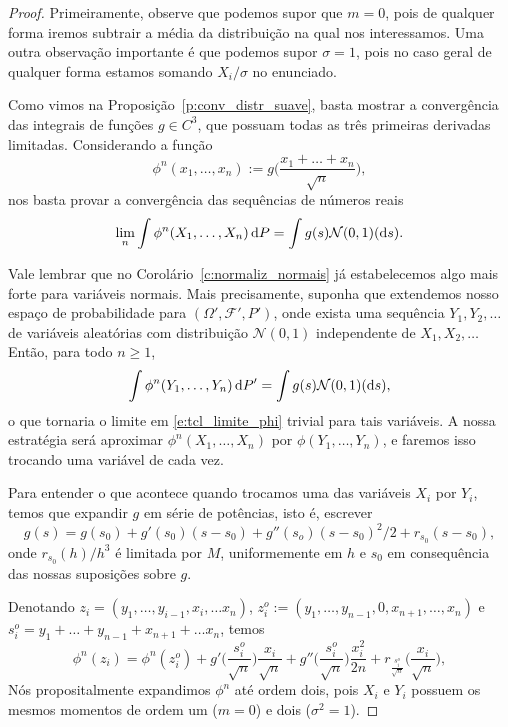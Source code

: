 \begin{proof}
  Primeiramente, observe que podemos supor que $m = 0$, pois de qualquer forma iremos subtrair a média da distribuição na qual nos interessamos.
  Uma outra observação importante é que podemos supor $\sigma = 1$, pois no caso geral de qualquer forma estamos somando $X_i/\sigma$ no enunciado.

  Como vimos na Proposição~\ref{p:conv_distr_suave}, basta mostrar a convergência das integrais de funções $g \in C^3$, que possuam todas as três primeiras derivadas limitadas.
  Considerando a função
  \begin{equation}
    \phi^n(x_1, \dots, x_n) := g\Big(\frac{x_1 + \dots + x_n}{\sqrt{n}} \Big),
  \end{equation}
  nos basta provar a convergência das sequências de números reais
  \begin{equation}
    \label{e:tcl_limite_phi}
    \lim_n \int \phi^n(X_1, \dots, X_n) \mathop{}\!\mathrm{d} P = \int g(s) \mathcal{N}(0,1)(\mathop{}\!\mathrm{d} s).
  \end{equation}

  Vale lembrar que no Corolário~\ref{c:normaliz_normais} já estabelecemos algo mais forte para variáveis normais.
  Mais precisamente, suponha que extendemos nosso espaço de probabilidade para $(\Omega', \mathcal{F}', P')$, onde exista uma sequência $Y_1, Y_2, \dots$ de variáveis aleatórias \iid com distribuição $\mathcal{N}(0,1)$ independente de $X_1, X_2, \dots$
  Então, para todo $n \geq 1$,
  \begin{equation}
    \int \phi^n(Y_1, \dots, Y_n) \mathop{}\!\mathrm{d} P' = \int g(s) \mathcal{N}(0,1) (\mathop{}\!\mathrm{d} s),
  \end{equation}
  o que tornaria o limite em \eqref{e:tcl_limite_phi} trivial para tais variáveis.
  A nossa estratégia será aproximar $\phi^n(X_1, \dots, X_n)$ por $\phi(Y_1, \dots, Y_n)$, e faremos isso trocando uma variável de cada vez.

  Para entender o que acontece quando trocamos uma das variáveis $X_i$ por $Y_i$, temos que expandir $g$ em série de potências, isto é, escrever
  \begin{equation}
    g(s) = g(s_0) + g'(s_0)(s - s_0) + g''(s_o)(s-s_0)^2/2 + r_{s_0}(s - s_0),
  \end{equation}
  onde $r_{s_0}(h)/h^3$ é limitada por $M$, uniformemente em $h$ e $s_0$ em consequência das nossas suposições sobre $g$.

  Denotando $z_i = (y_1, \dots, y_{i-1}, x_i, \dots x_n)$, $z_i^o := (y_1, \dots, y_{n-1}, 0, x_{n+1}, \dots, x_n)$ e $s_i^o = y_1 + \dots + y_{n-1} + x_{n+1} + \dots x_n$, temos
  \begin{equation}
    \phi^n(z_i) %
    = \phi^n(z_i^o) + g' \Big( \frac{s_i^o}{\sqrt{n}} \Big) \frac{x_i}{\sqrt{n}} + g'' \Big( \frac{s_i^o}{\sqrt{n}} \Big) \frac{x_i^2}{2n} + r_{\frac{s_i^o}{\sqrt{n}}} \Big( \frac{x_i}{\sqrt{n}} \Big),
  \end{equation}
  Nós propositalmente expandimos $\phi^n$ até ordem dois, pois $X_i$ e $Y_i$ possuem os mesmos momentos de ordem um ($m=0$) e dois ($\sigma^2=1$).


\end{proof}
